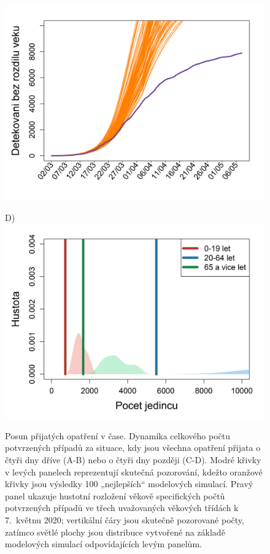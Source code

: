 \begin{figure}
\begin{center}
\begin{minipage}[m]{0.45\textwidth}
			\includegraphics[width = \textwidth]{pic/sc_4later.png}
		\end{minipage}
		\begin{minipage}[m]{0.45\textwidth}
			D) \\
			\includegraphics[width = \textwidth]{pic/sc_4later_PDF.png}
		\end{minipage}
	\end{center}
	\caption{Posun přijatých opatření v čase. Dynamika celkového počtu potvrzených případů za situace, kdy jsou všechna opatření přijata o čtyři dny dříve (A-B) nebo o čtyři dny později (C-D). Modré křivky v levých panelech reprezentují skutečná pozorování, kdežto oranžové křivky jsou výsledky 100 „nejlepších“ modelových simulací. Pravý panel ukazuje hustotní rozložení věkově specifických počtů potvrzených případů ve třech uvažovaných věkových třídách k 7.\ květnu 2020; vertikální čáry jsou skutečně pozorované počty, zatímco světlé plochy jsou distribuce vytvořené na základě modelových simulací odpovídajících levým panelům.}
	\label{scenariosR1R2}
\end{figure}

